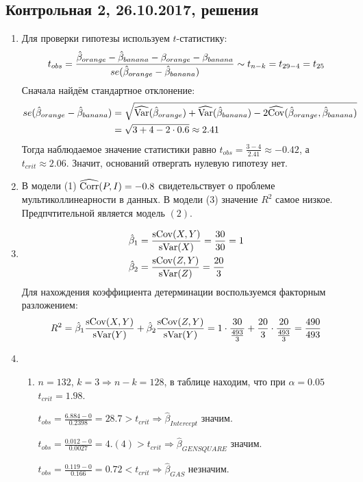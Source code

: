 \subsection{Контрольная 2, 26.10.2017, решения}

\begin{enumerate}
\item Для проверки гипотезы используем $t$-статистику:
\[
t_{obs} = \frac{\hat{\beta}_{orange} - \hat{\beta}_{banana} - \beta_{orange} - \beta_{banana}}{se(\hat{\beta}_{orange} - \hat{\beta}_{banana})} \sim t_{n-k} = t_{29 -4} = t_{25}
\]
Сначала найдём стандартное отклонение:
\begin{align*}
se(\hat{\beta}_{orange} - \hat{\beta}_{banana}) &= \sqrt{\widehat{\operatorname{Var}}(\hat{\beta}_{orange}) + \widehat{\operatorname{Var}}(\hat{\beta}_{banana}) - 2 \widehat{\operatorname{Cov}}(\hat{\beta}_{orange}, \hat{\beta}_{banana})} \\
&= \sqrt{3 + 4 - 2\cdot 0.6} \approx 2.41
\end{align*}
Тогда наблюдаемое значение статистики равно $t_{obs} = \frac{3-4}{2.41} \approx -0.42$,
а $t_{crit} \approx 2.06$. Значит, оснований отвергать нулевую гипотезу нет.
\item В модели (1) $\widehat{\operatorname{Corr}}(P,I)=-0.8$ свидетельствует о проблеме мультиколлинеарности в данных.
В модели (3) значение $R^2$ самое низкое. Предпчтительной является модель $(2)$.
\item
\begin{align*}
\hat \beta_1 &= \frac{\operatorname{sCov}(X,Y)}{\operatorname{sVar}(X)} = \frac{30}{30} = 1 \\
\hat \beta_2 &= \frac{\operatorname{sCov}(Z,Y)}{\operatorname{sVar}(Z)} = \frac{20}{3}
\end{align*}
Для нахождения коэффициента детерминации воспользуемся факторным разложением:
\[
R^2 = \hat{\beta}_1 \frac{\operatorname{sCov}(X,Y)}{\operatorname{sVar}(Y)} + \hat{\beta}_2 \frac{\operatorname{sCov}(Z,Y)}{\operatorname{sVar}(Y)} = 1 \cdot \frac{30}{\frac{493}{3}} + \frac{20}{3} \cdot \frac{20}{\frac{493}{3}} = \frac{490}{493}
\]
\item
\begin{enumerate}
\item $n=132$, $k=3 \Rightarrow n-k = 128$, в таблице находим,
что при $\alpha = 0.05$ $t_{crit} = 1.98$.

$t_{obs} = \frac{6.884 - 0}{0.2398} = 28.7 > t_{crit} \Rightarrow \hat \beta_{Intercept}$ значим.

$t_{obs} = \frac{0.012 - 0}{0.0027} = 4.(4) > t_{crit} \Rightarrow \hat \beta_{GENSQUARE}$ значим.

$t_{obs} = \frac{0.119 - 0}{0.166} = 0.72 < t_{crit} \Rightarrow \hat \beta_{GAS}$ незначим.


\end{enumerate}
\end{enumerate}
